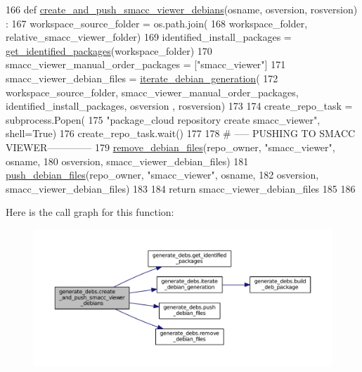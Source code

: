 \begin{DoxyCode}
166 \textcolor{keyword}{def }\hyperlink{namespacegenerate__debs_a9a6167ed98fbdc7b1e1c56da5652cf19}{create\_and\_push\_smacc\_viewer\_debians}(osname, osversion, rosversion)
      :
167     workspace\_source\_folder = os.path.join(
168         workspace\_folder, relative\_smacc\_viewer\_folder)
169     identified\_install\_packages = \hyperlink{namespacegenerate__debs_aa91b87c6d9c3ed04015845cc9298431a}{get\_identified\_packages}(workspace\_folder)
170     smacc\_viewer\_manual\_order\_packages = [\textcolor{stringliteral}{"smacc\_viewer"}]
171     smacc\_viewer\_debian\_files = \hyperlink{namespacegenerate__debs_a2615a6fc7860b6aa9e920e6b4d886589}{iterate\_debian\_generation}(
172         workspace\_source\_folder, smacc\_viewer\_manual\_order\_packages, identified\_install\_packages, osversion
      , rosversion)
173 
174     create\_repo\_task = subprocess.Popen(
175         \textcolor{stringliteral}{"package\_cloud repository create smacc\_viewer"}, shell=\textcolor{keyword}{True})
176     create\_repo\_task.wait()
177 
178     \textcolor{comment}{# ----- PUSHING TO SMACC VIEWER--------------}
179     \hyperlink{namespacegenerate__debs_a08095040d038b3613ad0e77fd4e7f60e}{remove\_debian\_files}(repo\_owner, \textcolor{stringliteral}{"smacc\_viewer"},  osname,
180                         osversion, smacc\_viewer\_debian\_files)
181     \hyperlink{namespacegenerate__debs_a9b22f5ad65b40b7903c467eda308e575}{push\_debian\_files}(repo\_owner, \textcolor{stringliteral}{"smacc\_viewer"}, osname,
182                       osversion, smacc\_viewer\_debian\_files)
183 
184     \textcolor{keywordflow}{return} smacc\_viewer\_debian\_files
185 
186 
\end{DoxyCode}


Here is the call graph for this function\+:
\nopagebreak
\begin{figure}[H]
\begin{center}
\leavevmode
\includegraphics[width=350pt]{namespacegenerate__debs_a9a6167ed98fbdc7b1e1c56da5652cf19_cgraph}
\end{center}
\end{figure}


